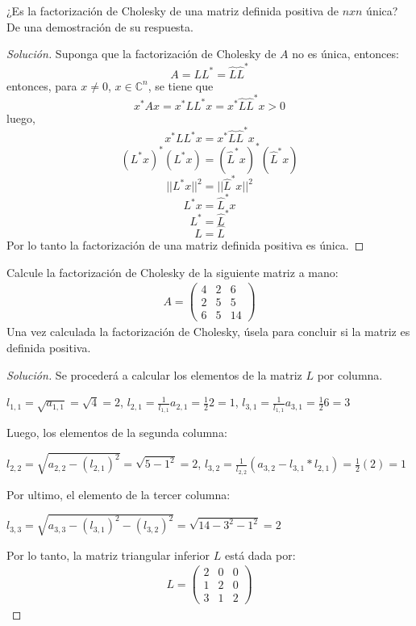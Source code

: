 \documentclass[12pt]{book}
\newenvironment{solucion}
  {\renewcommand\qedsymbol{$\square$}\begin{proof}[Solución]}
  {\end{proof}}
\begin{document}
\eje ¿Es la factorización de Cholesky de una matriz definida positiva de $nxn$ única? De una demostración de su respuesta.

\begin{solucion}
Suponga que la factorización de Cholesky de $A$ no es única, entonces:
\[A=LL^*=\hat{L}\hat{L}^*\]
entonces, para $x\ne 0$, $x\in\mathbb{C}^n$, se tiene que
\[x^*Ax=x^*LL^*x=x^*\hat{L}\hat{L}^*x>0\]
luego,
\[x^*LL^*x=x^*\hat{L}\hat{L}^*x\]
\[(L^*x)^*(L^*x)=(\hat{L}^*x)^*(\hat{L}^*x)\]
\[||L^*x||^2=||\hat{L}^*x||^2\]
\[L^*x=\hat{L}^*x\]
\[L^*=\hat{L}^*\]
\[L=\hat{L}\]
Por lo tanto la factorización de una matriz definida positiva es única.
\end{solucion}

\eje
Calcule la factorización de Cholesky de la siguiente matriz a mano:
\begin{align*}
    A=\begin{pmatrix}
        4&2&6\\
        2&5&5\\
        6&5&14
    \end{pmatrix}
\end{align*}
Una vez calculada la factorización de Cholesky, úsela para concluir si la matriz es definida positiva.
\begin{solucion}
    Se procederá a calcular los elementos de la matriz $L$ por columna.
    \begin{center}
        $l_{1,1}=\sqrt{a_{1,1}}=\sqrt{4}=2$, 
        $l_{2,1}=\frac{1}{l_{1,1}}a_{2,1}=\frac{1}{2}2=1$, 
        $l_{3,1}=\frac{1}{l_{1,1}}a_{3,1}=\frac{1}{2}6=3$
    \end{center}
    Luego, los elementos de la segunda columna:
    \begin{center}
        $l_{2,2}=\sqrt{a_{2,2}-(l_{2,1})^2}=\sqrt{5-1^2}=2$, 
        $l_{3,2}=\frac{1}{l_{2,2}}(a_{3,2}-l_{3,1}*l_{2,1})=\frac{1}{2}(2)=1$
    \end{center}
     Por ultimo, el elemento de la tercer columna:
    \begin{center}
        $l_{3,3}=\sqrt{a_{3,3}-(l_{3,1})^2-(l_{3,2})^2}=\sqrt{14-3^2-1^2}=2$
    \end{center}
    Por lo tanto, la matriz triangular inferior $L$ está dada por:
    \begin{align*}
    L=\begin{pmatrix}
        2&0&0\\
        1&2&0\\
        3&1&2
    \end{pmatrix}
\end{align*}
   
    
\end{solucion}
\end{document}
